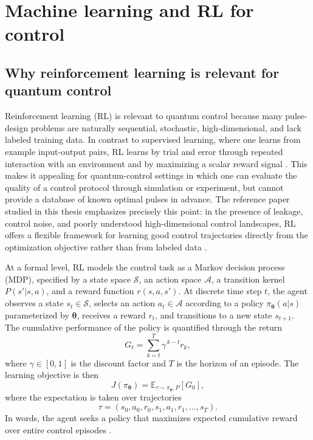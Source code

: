 \section{Machine learning and RL for control}
\subsection{Why reinforcement learning is relevant for quantum control}
\label{subsec:why_rl_is_relevant}

Reinforcement learning (RL) is relevant to quantum control because many pulse-design problems are naturally sequential, stochastic, high-dimensional, and lack labeled training data. In contrast to supervised learning, where one learns from example input-output pairs, RL learns by trial and error through repeated interaction with an environment and by maximizing a scalar reward signal \cite{SuttonBarto2018,Giannelli2022}. This makes it appealing for quantum-control settings in which one can evaluate the quality of a control protocol through simulation or experiment, but cannot provide a database of known optimal pulses in advance. The reference paper studied in this thesis emphasizes precisely this point: in the presence of leakage, control noise, and poorly understood high-dimensional control landscapes, RL offers a flexible framework for learning good control trajectories directly from the optimization objective rather than from labeled data \cite{Niu2019}.

At a formal level, RL models the control task as a Markov decision process (MDP), specified by a state space $\mathcal{S}$, an action space $\mathcal{A}$, a transition kernel $P(s'|s,a)$, and a reward function $r(s,a,s')$. At discrete time step $t$, the agent observes a state $s_t\in\mathcal{S}$, selects an action $a_t\in\mathcal{A}$ according to a policy $\pi_{\bm{\theta}}(a|s)$ parameterized by $\bm{\theta}$, receives a reward $r_t$, and transitions to a new state $s_{t+1}$. The cumulative performance of the policy is quantified through the return
\begin{equation}
G_t
=
\sum_{k=t}^{T}
\gamma^{\,k-t} r_k,
\label{eq:rl_return}
\end{equation}
where $\gamma\in[0,1]$ is the discount factor and $T$ is the horizon of an episode. The learning objective is then
\begin{equation}
J(\pi_{\bm{\theta}})
=
\mathbb{E}_{\tau\sim \pi_{\bm{\theta}},P}
\left[
G_0
\right],
\label{eq:rl_objective}
\end{equation}
where the expectation is taken over trajectories
\begin{equation}
\tau
=
(s_0,a_0,r_0,s_1,a_1,r_1,\dots,s_T).
\label{eq:rl_trajectory}
\end{equation}
In words, the agent seeks a policy that maximizes expected cumulative reward over entire control episodes \cite{SuttonBarto2018}.

